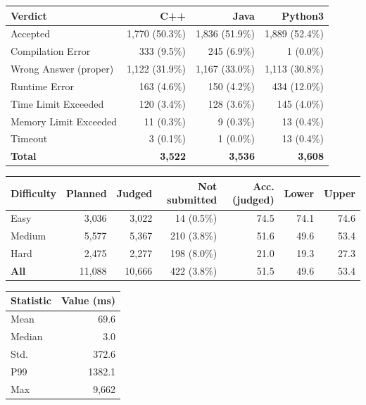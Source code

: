 \begin{tabular}{lrrr}
\hline\hline
\textbf{Verdict} & \textbf{C++} & \textbf{Java} & \textbf{Python3} \\
\hline
Accepted & 1{,}770 (50.3\%) & 1{,}836 (51.9\%) & 1{,}889 (52.4\%) \\
Compilation Error & 333 (9.5\%) & 245 (6.9\%) & 1 (0.0\%) \\
Wrong Answer (proper) & 1{,}122 (31.9\%) & 1{,}167 (33.0\%) & 1{,}113 (30.8\%) \\
Runtime Error & 163 (4.6\%) & 150 (4.2\%) & 434 (12.0\%) \\
Time Limit Exceeded & 120 (3.4\%) & 128 (3.6\%) & 145 (4.0\%) \\
Memory Limit Exceeded & 11 (0.3\%) & 9 (0.3\%) & 13 (0.4\%) \\
Timeout & 3 (0.1\%) & 1 (0.0\%) & 13 (0.4\%) \\
\hline
\textbf{Total} & \textbf{3{,}522} & \textbf{3{,}536} & \textbf{3{,}608} \\
\hline\hline
\end{tabular}

\begin{tabular}{lrrrrrr}
\hline\hline
\textbf{Difficulty} & \textbf{Planned} & \textbf{Judged} & \textbf{Not submitted} & \textbf{Acc. (judged)} & \textbf{Lower} & \textbf{Upper} \\
\hline
Easy & 3{,}036 & 3{,}022 & 14 (0.5\%) & 74.5 & 74.1 & 74.6 \\
Medium & 5{,}577 & 5{,}367 & 210 (3.8\%) & 51.6 & 49.6 & 53.4 \\
Hard & 2{,}475 & 2{,}277 & 198 (8.0\%) & 21.0 & 19.3 & 27.3 \\
\hline
\textbf{All} & 11{,}088 & 10{,}666 & 422 (3.8\%) & 51.5 & 49.6 & 53.4 \\
\hline\hline
\end{tabular}

\begin{tabular}{lr}
\hline\hline
\textbf{Statistic} & \textbf{Value (ms)} \\
\hline
Mean & 69.6 \\
Median & 3.0 \\
Std.\ & 372.6 \\
P99 & 1382.1 \\
Max & 9{,}662 \\
\hline\hline
\end{tabular}

